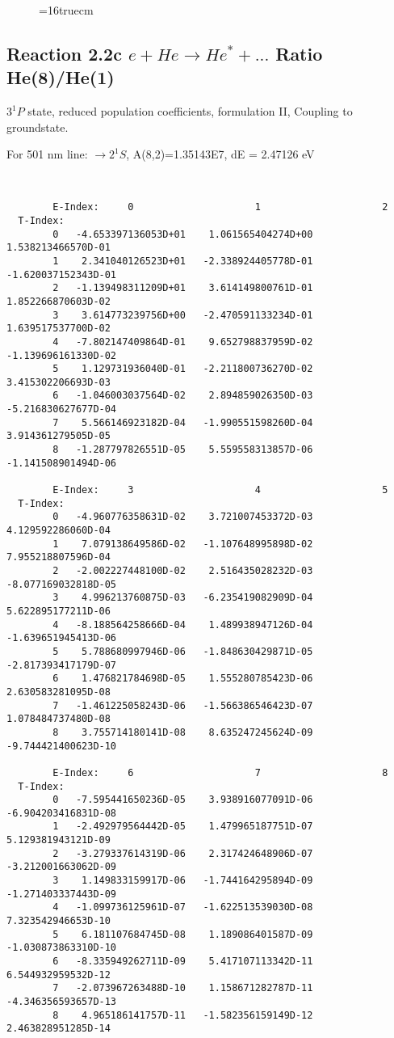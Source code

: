\documentclass[12pt]{article}
\begin{document}
\begin{figure} \label{2.2b}
\epsfxsize=16truecm
\end{figure}
\newpage


\subsection{
  Reaction 2.2c $e + He \rightarrow He^* + ... $ Ratio He(8)/He(1)
}

  $3^1P$ state,
  reduced population coefficients, formulation II,
  Coupling to groundstate.

  For 501 nm line: $\rightarrow 2^1S$, A(8,2)=1.35143E7, dE = 2.47126 eV

\begin{small}\begin{verbatim}


        E-Index:     0                     1                     2
  T-Index:
        0   -4.653397136053D+01    1.061565404274D+00    1.538213466570D-01
        1    2.341040126523D+01   -2.338924405778D-01   -1.620037152343D-01
        2   -1.139498311209D+01    3.614149800761D-01    1.852266870603D-02
        3    3.614773239756D+00   -2.470591133234D-01    1.639517537700D-02
        4   -7.802147409864D-01    9.652798837959D-02   -1.139696161330D-02
        5    1.129731936040D-01   -2.211800736270D-02    3.415302206693D-03
        6   -1.046003037564D-02    2.894859026350D-03   -5.216830627677D-04
        7    5.566146923182D-04   -1.990551598260D-04    3.914361279505D-05
        8   -1.287797826551D-05    5.559558313857D-06   -1.141508901494D-06

        E-Index:     3                     4                     5
  T-Index:
        0   -4.960776358631D-02    3.721007453372D-03    4.129592286060D-04
        1    7.079138649586D-02   -1.107648995898D-02    7.955218807596D-04
        2   -2.002227448100D-02    2.516435028232D-03   -8.077169032818D-05
        3    4.996213760875D-03   -6.235419082909D-04    5.622895177211D-06
        4   -8.188564258666D-04    1.489938947126D-04   -1.639651945413D-06
        5    5.788680997946D-06   -1.848630429871D-05   -2.817393417179D-07
        6    1.476821784698D-05    1.555280785423D-06    2.630583281095D-08
        7   -1.461225058243D-06   -1.566386546423D-07    1.078484737480D-08
        8    3.755714180141D-08    8.635247245624D-09   -9.744421400623D-10

        E-Index:     6                     7                     8
  T-Index:
        0   -7.595441650236D-05    3.938916077091D-06   -6.904203416831D-08
        1   -2.492979564442D-05    1.479965187751D-07    5.129381943121D-09
        2   -3.279337614319D-06    2.317424648906D-07   -3.212001663062D-09
        3    1.149833159917D-06   -1.744164295894D-09   -1.271403337443D-09
        4   -1.099736125961D-07   -1.622513539030D-08    7.323542946653D-10
        5    6.181107684745D-08    1.189086401587D-09   -1.030873863310D-10
        6   -8.335949262711D-09    5.417107113342D-11    6.544932959532D-12
        7   -2.073967263488D-10    1.158671282787D-11   -4.346356593657D-13
        8    4.965186141757D-11   -1.582356159149D-12    2.463828951285D-14


\end{verbatim}
\end{small}
\end{document}
